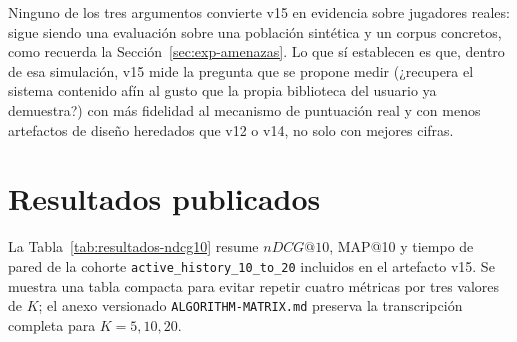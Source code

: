 Ninguno de los tres argumentos convierte v15 en evidencia sobre jugadores reales: sigue siendo
una evaluación sobre una población sintética y un corpus concretos, como recuerda la
Sección~\ref{sec:exp-amenazas}. Lo que sí establecen es que, dentro de esa simulación, v15
mide la pregunta que se propone medir (¿recupera el sistema contenido afín al gusto que la
propia biblioteca del usuario ya demuestra?) con más fidelidad al mecanismo de puntuación real
y con menos artefactos de diseño heredados que v12 o v14, no solo con mejores cifras.

\section{Resultados publicados}

La Tabla~\ref{tab:resultados-ndcg10} resume \(nDCG@10\), MAP@10 y tiempo de pared de la cohorte \texttt{active\_history\_10\_to\_20} incluidos en el artefacto v15. Se muestra una tabla compacta para evitar repetir cuatro métricas por tres valores de \(K\); el anexo versionado \texttt{ALGORITHM-MATRIX.md} preserva la transcripción completa para \(K=5,10,20\).

